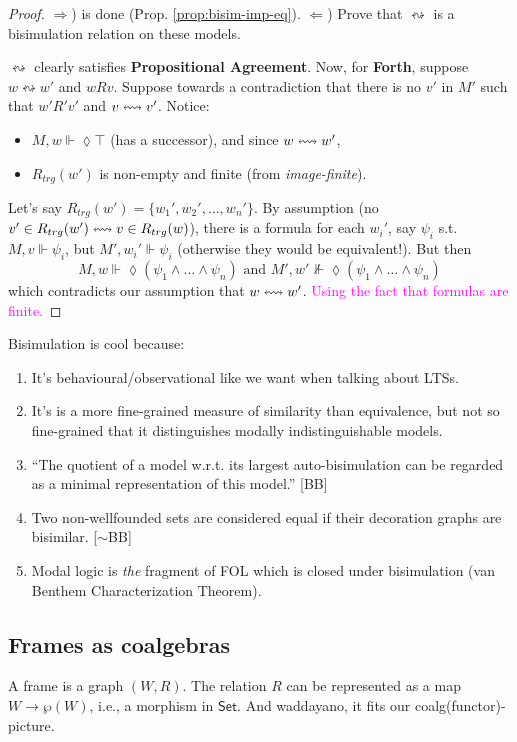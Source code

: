 \begin{proof}
$\Rightarrow$) is done (Prop. \ref{prop:bisim-imp-eq}). $\Leftarrow$) Prove that $\leftrightsquigarrow$ is a bisimulation relation on these models.

$\leftrightsquigarrow$ clearly satisfies \textbf{Propositional Agreement}. Now, for \textbf{Forth}, suppose $w \leftrightsquigarrow w'$ and $wRv$. Suppose towards a contradiction that there is no $v'$ in $M'$ such that $w'R'v'$ and $v \leftrightsquigarrow v'$. Notice:
\begin{itemize}
\item $M, w \Vdash \lozenge \top$ (has a successor), and since $w \leftrightsquigarrow w'$, 
\item $R_{trg}(w')$ is non-empty and finite (from \textit{image-finite}).
\end{itemize}
Let's say $R_{trg}(w') = \{w_1', w_2', \dots, w_n'\}$. By assumption (no $v' \in R_{trg}(w') \leftrightsquigarrow v \in R_{trg}(w)$), there is a formula for each $w_i'$, say $\psi_i$ s.t. $M, v \Vdash \psi_i$, but $M', w_i' \Vdash \psi_i$ (otherwise they would be equivalent!). But then 
$$M, w \Vdash \lozenge (\psi_1 \wedge \dots \wedge \psi_n) \text{ and } M', w' \nVdash \lozenge(\psi_1 \wedge \ldots \wedge \psi_n)$$
which contradicts our assumption that $w \leftrightsquigarrow w'$. \textcolor{magenta}{Using the fact that formulas are finite.}
\end{proof}

Bisimulation is cool because:\begin{enumerate}
\item It's behavioural/observational like we want when talking about LTSs.
\item It's is a more fine-grained measure of similarity than equivalence, but not so fine-grained that it distinguishes modally indistinguishable models.
\item ``The quotient of a model w.r.t. its largest auto-bisimulation can be regarded as a minimal representation of this model.'' [BB]
\item Two non-wellfounded sets are considered equal if their decoration graphs are bisimilar. [$\sim$BB]
\item Modal logic is \textit{the} fragment of FOL which is closed under bisimulation (van Benthem Characterization Theorem).
\end{enumerate}

\subsection{Frames as coalgebras}
A frame is a graph $(W, R)$. The relation $R$ can be represented as a map $W \to \wp(W)$, i.e., a morphism in $\mathsf{Set}$. And waddayano, it fits our coalg(functor)-picture. 

